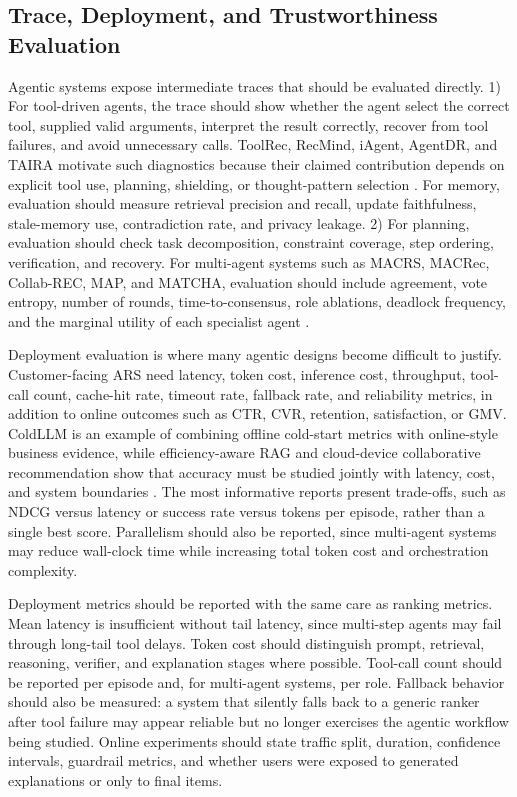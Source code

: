 \subsection{Trace, Deployment, and Trustworthiness Evaluation}
\label{subsec:trace-deployment-trust-eval}

Agentic systems expose intermediate traces that should be evaluated directly. 
1) For tool-driven agents, the trace should show whether the agent select the correct tool, supplied valid arguments, interpret the result correctly, recover from tool failures, and avoid unnecessary calls. ToolRec, RecMind, iAgent, AgentDR, and TAIRA motivate such diagnostics because their claimed contribution depends on explicit tool use, planning, shielding, or thought-pattern selection \cite{zhao2024toolrec,wang2024recmind,xu2025iagent,yang2025agentdr,yu2025thought}. For memory, evaluation should measure retrieval precision and recall, update faithfulness, stale-memory use, contradiction rate, and privacy leakage. 
2) For planning, evaluation should check task decomposition, constraint coverage, step ordering, verification, and recovery. For multi-agent systems such as MACRS, MACRec, Collab-REC, MAP, and MATCHA, evaluation should include agreement, vote entropy, number of rounds, time-to-consensus, role ablations, deadlock frequency, and the marginal utility of each specialist agent \cite{fang2024multi,wang2024macrec,banerjee2025collab,lee2025map,hui2025matcha}.

Deployment evaluation is where many agentic designs become difficult to justify. Customer-facing ARS need latency, token cost, inference cost, throughput, tool-call count, cache-hit rate, timeout rate, fallback rate, and reliability metrics, in addition to online outcomes such as CTR, CVR, retention, satisfaction, or GMV. ColdLLM is an example of combining offline cold-start metrics with online-style business evidence, while efficiency-aware RAG and cloud-device collaborative recommendation show that accuracy must be studied jointly with latency, cost, and system boundaries \cite{huang2025large,zhou2025efficiency,long2025cloud}. The most informative reports present trade-offs, such as NDCG versus latency or success rate versus tokens per episode, rather than a single best score. Parallelism should also be reported, since multi-agent systems may reduce wall-clock time while increasing total token cost and orchestration complexity.



Deployment metrics should be reported with the same care as ranking metrics. Mean latency is insufficient without tail latency, since multi-step agents may fail through long-tail tool delays. Token cost should distinguish prompt, retrieval, reasoning, verifier, and explanation stages where possible. Tool-call count should be reported per episode and, for multi-agent systems, per role. Fallback behavior should also be measured: a system that silently falls back to a generic ranker after tool failure may appear reliable but no longer exercises the agentic workflow being studied. Online experiments should state traffic split, duration, confidence intervals, guardrail metrics, and whether users were exposed to generated explanations or only to final items.

